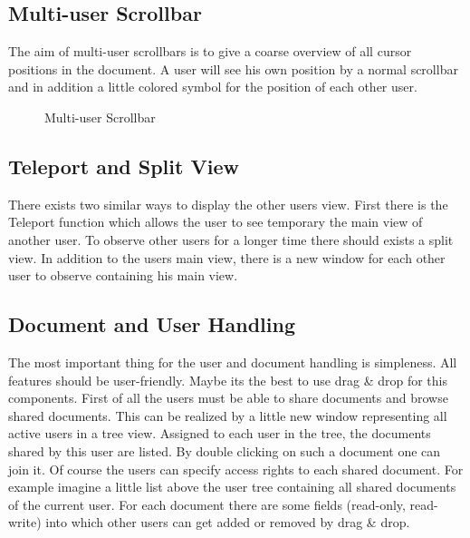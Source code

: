 \documentclass[11pt,a4paper]{article}
\begin{document}
\subsection{Multi-user Scrollbar}
The aim of multi-user scrollbars is to give a coarse overview of all cursor positions in the document. A user will see his own position by a normal scrollbar and in addition a little colored symbol for the position of each other user.
\begin{figure}[H]
\centering
{}
\caption{Multi-user Scrollbar}
\end{figure}

\subsection{Teleport and Split View}
There exists two similar ways to display the other users view. First there is the Teleport function which allows the user to see temporary the main view of another user. To observe other users for a longer time there should exists a split view. In addition to the users main view, there is a new window for each other user to observe containing his main view.

\subsection{Document and User Handling}
The most important thing for the user and document handling is simpleness. All features should be user-friendly. Maybe its the best to use drag \& drop for this components. First of all the users must be able to share documents and browse shared documents. This can be realized by a little new window representing all active users in a tree view. Assigned to each user in the tree, the documents shared by this user are listed. By double clicking on such a document one can join it. Of course the users can specify access rights to each shared document. For example imagine a little list above the user tree containing all shared documents of the current user. For each document there are some fields (read-only, read-write) into which other users can get added or removed by drag \& drop.
\end{document}
